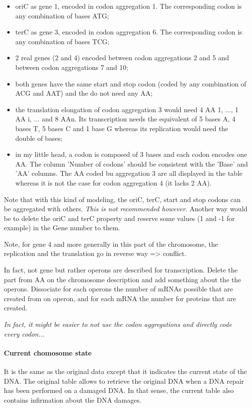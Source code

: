 \begin{itemize}
  \item oriC as gene 1, encoded in codon aggregation 1. The corresponding codon is any combination of bases ATG;
  \item terC as gene 3, encoded in codon aggregation 6. The corresponding codon is any combination of bases TCG;
  \item 2 real genes (2 and 4) encoded between codon aggregations 2 and 5 and between codon aggregations 7 and 10;
  \item both genes have the same start and stop codon (coded by any combination of ACG and AAT) and the do not need any AA;
  \item the translation elongation of codon aggregation 3 would need 4 AA 1, ..., 1 AA i, ... and 8 AAn. Its transcription needs the equivalent of 5 bases A, 4 bases T, 5 bases C and 1 base G whereas its replication would need the double of bases;
  \item in my little head, a codon is composed of 3 bases and each codon encodes one AA. The column 'Number of codons' should be consistent with the 'Base' and 'AA' columns. The AA coded bu aggregation 3 are all displayed in the table whereas it is not the case for codon aggregation 4 (it lacks 2 AA).
\end{itemize}
Note that with this kind of modeling, the oriC, terC, start and stop codons can be aggregated with others. \emph{This is not recommended however}. Another way would be to delete the oriC and terC property and reserve some values (1 and -1 for example) in the Gene number to them.

\textcolor[rgb]{1.00,0.00,0.00}{Note, for gene 4 and more generally in this part of the chromosome, the replication and the translation go in reverse way => conflict.}

\medskip

\textcolor[rgb]{1.00,0.00,0.00}{In fact, not gene but rather operons are described for transcription. Delete the part from AA on the chromosome description and add something about the the operons. Dissociate for each operons the number of mRNAs possible that are created from on operon, and for each mRNA the number for proteins that are created.}

\medskip

\textcolor[rgb]{1.00,0.00,0.00}{\emph{In fact, it might be easier to not use the codon aggregations and directly code every codon...}}

\paragraph{Current chomosome state}
\textcolor[rgb]{1.00,0.00,0.00}{It is the same as the original data except that it indicates the current state of the DNA. The original table allows to retrieve the original DNA when a DNA repair has been performed on a damaged DNA. In that sense, the current table also contains infirmation about the DNA damages.}


